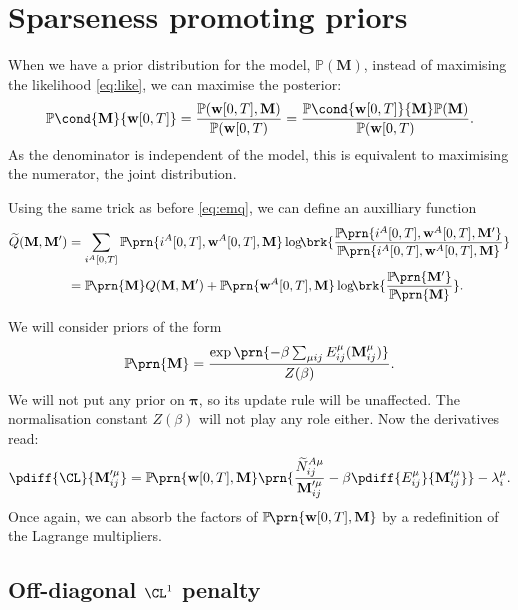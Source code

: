 \documentclass[12pt]{article}
\newcommand{\pib}{\boldsymbol{\pi}}
\newcommand{\w}{\mathbf{w}}
\newcommand{\M}{\mathbf{M}}
\newcommand{\pr}{\mathbb{P}}
\begin{document}
\section{Sparseness promoting priors \label{sec:priors}}

When we have a prior distribution for the model, $\pr(\M)$, instead of maximising the likelihood \eqref{eq:like}, we can maximise the posterior:
%
\begin{equation}\label{eq:posterior}
  \pr\cond{\M}{\w[0,T]} = \frac{ \pr(\w[0,T],\M) }{ \pr(\w[0,T) } = \frac{ \pr\cond{\w[0,T]}{\M} \pr(\M) }{ \pr(\w[0,T) }.
\end{equation}
%
As the denominator is independent of the model, this is equivalent to maximising the numerator, \ie the joint distribution.

Using the same trick as before \eqref{eq:emq}, we can define an auxilliary function
%
\begin{equation}\label{eq:emqprior}
\begin{aligned}
  \widetilde{Q}(\M,\M') &= \sum_{i^A[0,T]} \pr\!\prn{i^A[0,T],\w^A[0,T],\M} \log\!\! \brk{
      \frac{ \pr\!\prn{i^A[0,T],\w^A[0,T],\M'} }{ \pr\!\prn{i^A[0,T],\w^A[0,T],\M} } }\\
      &= \pr\!\prn{\M} Q(\M,\M') + \pr\!\prn{\w^A[0,T],\M} \log\!\! \brk{
      \frac{ \pr\!\prn{\M'} }{ \pr\!\prn{\M} } }.
\end{aligned}
\end{equation}
%

We will consider priors of the form
%
\begin{equation}\label{eq:priorsum}
  \pr\!\prn{\M} = \frac{\exp\prn{-\beta\sum_{\mu ij}E^\mu_{ij}(\M^\mu_{ij})}}{Z(\beta)}.
\end{equation}
%
We will not put any prior on $\pib$, so its update rule will be unaffected.
The normalisation constant $Z(\beta)$ will not play any role either.
Now the derivatives read:
%
\begin{equation}\label{eq:priordiffs}
  \pdiff{\CL}{\M'^\mu_{ij}} 
    = \pr\!\prn{\w[0,T],\M} \prn{ \frac{ \widetilde{N}^{A\mu}_{ij} }{ \M'^\mu_{ij} }  - \beta \pdiff{E^\mu_{ij}}{\M'^\mu_{ij}} }- \lambda^\mu_{i}.
\end{equation}
%
Once again, we can absorb the factors of $\pr\!\prn{\w[0,T],\M}$ by a redefinition of the Lagrange multipliers.


\subsection{Off-diagonal $\CL^1$ penalty \label{sec:offdiagL1}}
\end{document}
